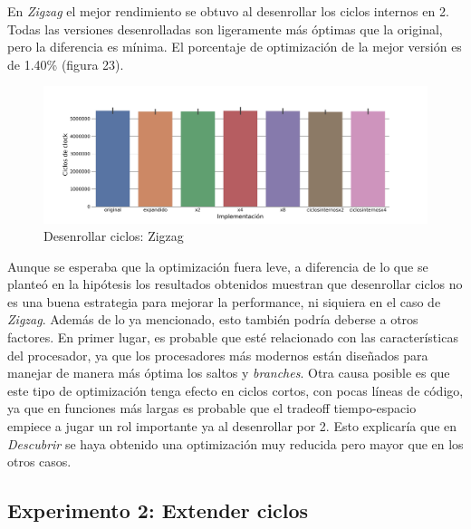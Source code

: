 \documentclass[a4paper]{article}
\begin{document}
En \textit{Zigzag} el mejor rendimiento se obtuvo al desenrollar los ciclos internos en 2. Todas las versiones desenrolladas son ligeramente más óptimas que la original, pero la diferencia es mínima. El porcentaje de optimización de la mejor versión es de 1.40\% (figura 23).

\begin{figure}[!htb]
  \begin{center}
	\includegraphics[scale=0.1]{img/exp1zigzag.jpg}
	\caption{Desenrollar ciclos: Zigzag}
  \end{center}
\end{figure}

Aunque se esperaba que la optimización fuera leve, a diferencia de lo que se planteó en la hipótesis los resultados obtenidos muestran que desenrollar ciclos no es una buena estrategia para mejorar la performance, ni siquiera en el caso de \textit{Zigzag}. Además de lo ya mencionado, esto también podría deberse a otros factores. En primer lugar, es probable que esté relacionado con las características del procesador, ya que los procesadores más modernos están diseñados para manejar de manera más óptima los saltos y \textit{branches}. Otra causa posible es que este tipo de optimización tenga efecto en ciclos cortos, con pocas líneas de código, ya que en funciones más largas es probable que el tradeoff tiempo-espacio empiece a jugar un rol importante ya al desenrollar por 2. Esto explicaría que en \textit{Descubrir} se haya obtenido una optimización muy reducida pero mayor que en los otros casos.

\subsection{Experimento 2: Extender ciclos}
\end{document}
